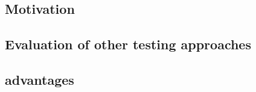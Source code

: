 

\subsection{Motivation}


\subsection{Evaluation of other testing approaches}


\subsection{\jb{}{} advantages}

